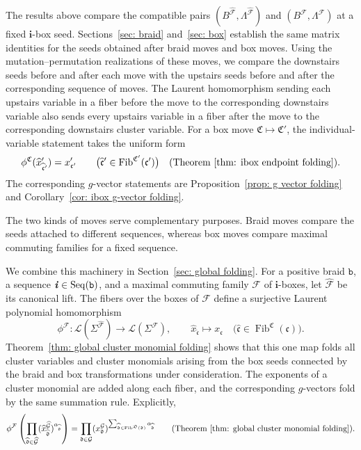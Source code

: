\documentclass[12pt, leqno]{amsart}
\numberwithin{equation}{section}
\theoremstyle{plain}
\theoremstyle{definition}
\newcommand{\ii}{ \textbf{\textit{i}}}
\newcommand{\Fib}{\operatorname{Fib}}
\newcommand{\hx}{\widehat{x}}
\newcommand{\frakC}{\mathfrak{C}}
\newcommand{\frakD}{\mathfrak{D}}
\newcommand{\frakc}{\mathfrak{c}}
\newcommand{\frakd}{\mathfrak{d}}
\newcommand{\hfrakc}{\widehat{\frakc}}
\newcommand{\hfrakd}{\widehat{\frakd}}
\newcommand{\bfi}{\mathbf{i}}
\newcommand{\calF}{\mathcal{F}}
\newcommand{\calG}{\mathcal{G}}
\newcommand{\calL}{\mathcal{L}}
\newcommand{\hcalF}{{\widehat{\calF}}}
\newcommand{\hcalG}{{\widehat{\calG}}}
\newcommand{\ttb}{\mathtt{b}}
\newcommand{\Seq}{\mathrm{Seq}}
\begin{document}
\smallskip

 The results above compare the compatible pairs
$(B^\hcalF,\Lambda^\hcalF)$ and $(B^\calF,\Lambda^\calF)$
at a fixed $\bfi$-box seed. Sections~\ref{sec: braid}
and~\ref{sec: box} establish the same matrix identities for
the seeds obtained after braid moves and box moves.
Using the mutation--permutation realizations of these moves,
we compare the downstairs seeds before and after each move with
the upstairs seeds before and after the corresponding sequence of moves.
The Laurent homomorphism sending each upstairs variable in a fiber
before the move to the corresponding downstairs variable also sends
every upstairs variable in a fiber after the move to the corresponding
downstairs cluster variable.{} For a box move $\frakC\longmapsto\frakC'$, the individual-variable statement{}
takes the uniform form
\[
\phi^\frakC(\hx'_{\hfrakc'})=x'_{\frakc'}
\qquad
\bigl(
\hfrakc'\in\Fib^{\frakC'}(\frakc')
\bigr) \quad \text{(Theorem~\ref{thm: ibox endpoint folding})}.
\]
The corresponding
$g$-vector statements are Proposition~\ref{prop: g vector folding}
and Corollary~\ref{cor: ibox g-vector folding}.
{}

The two kinds of moves serve complementary purposes. Braid moves
 compare the seeds{} attached to different sequences, whereas box
moves compare maximal commuting families for a fixed sequence. {}

\smallskip

We combine this machinery in Section~\ref{sec: global folding}. For a
positive braid $\ttb$, a sequence $\ii\in\Seq(\ttb)$, and a maximal
commuting family $\calF$ of $\bfi$-boxes, let $\hcalF$ be its
canonical lift.
 The fibers over the boxes of $\calF$ define  a surjective Laurent polynomial homomorphism
\[
\phi^\calF:\calL(\Sigma^\hcalF)\longrightarrow
\calL(\Sigma^\calF),
\qquad
\hx_{\hfrakc}\longmapsto x_\frakc
\quad\bigl(\hfrakc\in\Fib^\frakC(\frakc)\bigr).
\]
Theorem~\ref{thm: global cluster monomial folding} shows that this one map folds all cluster variables
and cluster monomials arising from the box seeds connected by the braid
and box transformations under consideration. The exponents of a
cluster monomial are added along each fiber, and the corresponding
$g$-vectors fold by  the same summation rule.
Explicitly,
\[
\phi^\calF\left(
\prod_{\hfrakd\in\hcalG}
(\hx_{\hfrakd}^{\hcalG})^{a_{\hfrakd}}
\right)
=
\prod_{\frakd\in\calG}
(x_{\frakd}^{\calG})^{
\sum_{\hfrakd\in\Fib^{\frakD}(\frakd)}a_{\hfrakd}} \qquad\text{(Theorem~\ref{thm: global cluster monomial folding})}.
\]
\end{document}
